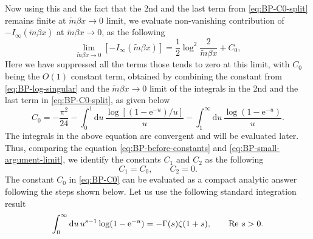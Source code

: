 \documentclass[a4paper,11pt]{article}
\newcommand{\e}{\mathrm e}
\newcommand{\dd}{\mathrm d}
\begin{document}
Now using this and the fact that the 2nd and the last term from \eqref{eq:BP-C0-split} remains finite at $\tilde m\beta x\to0$ limit, we evaluate non-vanishing contribution of $-I_\infty(\tilde{m}\beta x)$ at $\tilde m\beta x\to0$, as the following
\begin{equation}
\lim_{\tilde m \beta x\to 0}[	-I_\infty(\tilde m\beta x)]
	=
	\frac12\log^2\!\frac{2}{\tilde m\beta x}
	+C_0,
	\label{eq:BP-small-argument-limit}
\end{equation}
Here we have suppressed all the terms those tends to zero at this limit, with $C_0$ being the $O(1)$ constant term, obtained by combining the constant from \eqref{eq:BP-log-singular} and the $\tilde m \beta x\to 0$ limit of the integrals in the 2nd and the last term in \eqref{eq:BP-C0-split}, as given below
 \begin{equation}
	C_0
	=
	-\frac{\pi^2}{24}
	-\int_0^1\dd u\,
	\frac{\log[(1-\e^{-u})/u]}{u}
	-\int_1^\infty\dd u\,
	\frac{\log(1-\e^{-u})}{u}.
	\label{eq:BP-C0}
\end{equation}
The integrals in the above equation are convergent and will be evaluated later. Thus, comparing the equation \eqref{eq:BP-before-constants} and \eqref{eq:BP-small-argument-limit}, we identify the constants $C_1$ and $C_2$ as the following
\begin{equation}
	C_1=C_0,
	\qquad
	C_2=0.
\end{equation}
The constant $C_0$ in \eqref{eq:BP-C0} can be evaluated as a compact analytic answer following the steps shown below. Let us use the following standard integration result
\begin{equation}
	\int_0^\infty \dd u\,u^{s-1}\log(1-\e^{-u})
	=
	-\Gamma(s)\zeta(1+s),
	\qquad {\rm Re}\ s>0.
\end{equation}
\end{document}

